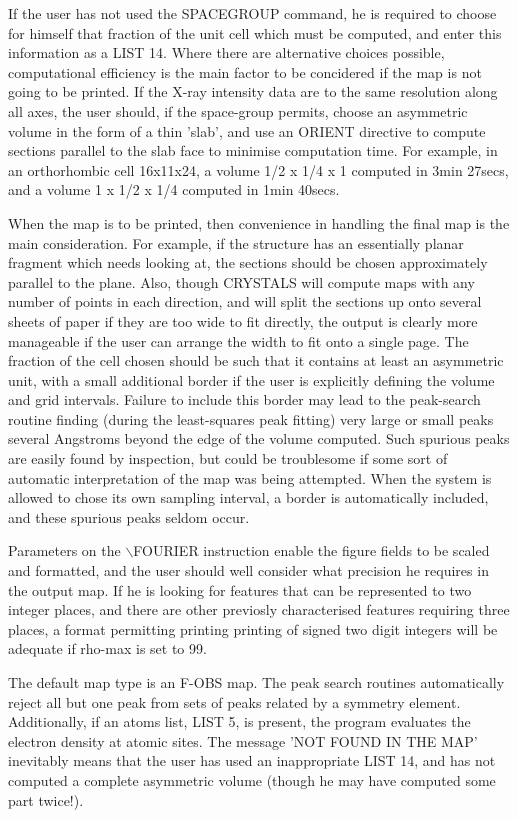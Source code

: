 \documentclass[10pt,a4paper]{report}
\begin{document}
If the user has not used the SPACEGROUP command, he is required to choose for himself that fraction of the unit cell which must be computed, and enter this information as a LIST 14. Where there are alternative choices possible, computational efficiency is the  main factor to be concidered if the map is not going to be printed.  If the X-ray intensity data are to the same resolution along all axes, the  user should, if the space-group permits, choose an asymmetric volume in  the form of a thin 'slab', and use an ORIENT directive to compute sections parallel to the slab face to minimise computation time. For example, in an orthorhombic  cell 16x11x24, a volume 1/2 x 1/4 x 1 computed in 3min 27secs, and a volume 1 x 1/2 x 1/4 computed in 1min 40secs.

When the map is to be printed, then convenience in handling the final  map is the main consideration. For example, if the structure has an essentially planar fragment which needs looking at, the sections should be chosen  approximately parallel to the plane. Also, though CRYSTALS will compute maps with any number of points in each direction, and will split the sections up onto several sheets of paper if they are too wide to fit directly, the output is clearly more manageable if the user can arrange the width to fit onto a single page. The fraction of the cell chosen should be such that it contains at  least an asymmetric unit, with a small additional border if the user  is explicitly defining the volume and grid intervals. Failure to include this border may lead to the peak-search routine finding (during the  least-squares peak fitting) very large or small peaks several Angstroms beyond the edge of the volume computed. Such spurious peaks are easily found by inspection, but could be troublesome if some sort of automatic interpretation of the map was being attempted. When the system is allowed to chose its own sampling interval, a border is  automatically included, and these spurious peaks seldom occur.

Parameters on the $\backslash$FOURIER instruction enable the figure fields to be scaled and formatted, and the user should well consider what precision he requires in the output map. If he is looking for features that can be represented to two integer places, and there are other previosly characterised features requiring three places, a format permitting printing printing of signed two digit integers will be adequate if rho-max is set to 99.

The default map type is an F-OBS map. The peak search routines automatically reject all but one peak  from sets of peaks related by a symmetry element. Additionally, if an atoms list, LIST 5, is present, the program evaluates the electron density at atomic sites. The message 'NOT FOUND IN THE MAP' inevitably means that the user has used an inappropriate LIST 14, and has not computed a complete asymmetric volume (though he may have computed some part twice!).
\end{document}
